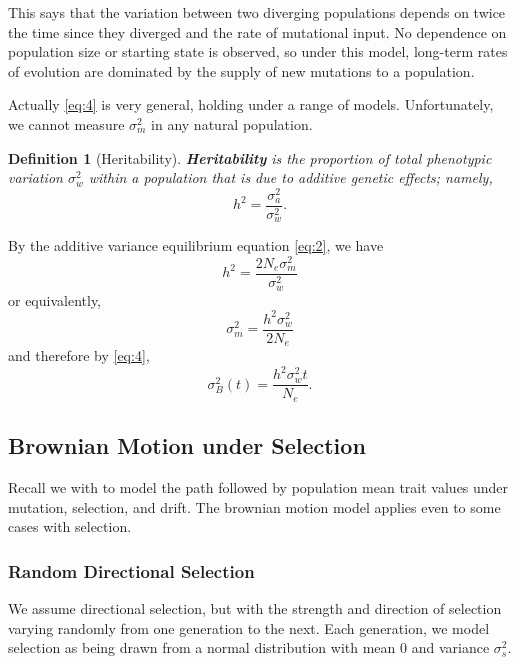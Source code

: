 \documentclass{article}
\newtheorem{definition}{Definition}
\newcommand{\1}[1]{\textbf{1}_{\left[#1\right]}} %
\newcommand{\advar}{\sigma_{a}^{2}} %
\newcommand{\bvar}{\sigma_{B}^{2}}  %
\newcommand{\mvar}{\sigma_{m}^{2}}  %
\newcommand{\wvar}{\sigma_{w}^{2}}  %
\newcommand{\svar}{\sigma_{s}^{2}}  %
\begin{document}
This says that the variation between two diverging populations depends on twice
the time since they diverged and the rate of mutational input. No dependence on
population size or starting state is observed, so under this model, long-term
rates of evolution are dominated by the supply of new mutations to a population.

Actually \eqref{eq:4} is very general, holding under a range of models.
Unfortunately, we cannot measure $\mvar$ in any natural population.




\begin{definition}[Heritability]
  \textbf{Heritability} is the proportion of total phenotypic variation $\wvar$
  within a population that is due to additive genetic effects; namely,
  \begin{equation}
    \label{eq:5}
    h^{2}=\frac{\advar}{\wvar}.
  \end{equation}
\end{definition}

By the additive variance equilibrium equation \eqref{eq:2}, we have
\begin{equation}
  \label{eq:6}
  h^{2}= \frac{2N_{e}\mvar}{\wvar}
\end{equation}
or equivalently,
\begin{equation}
  \label{eq:7}
  \mvar = \frac{h^{2}\wvar}{2N_{e}}
\end{equation}
and therefore by \eqref{eq:4},
\begin{equation}
  \label{eq:8}
  \bvar(t) = \frac{h^{2}\wvar t}{N_{e}}.
\end{equation}


\subsection{Brownian Motion under Selection}
Recall we with to model the path followed by population mean trait values under
mutation, selection, and drift. The brownian motion model applies even to some
cases with selection.

\subsubsection{Random Directional Selection}
We assume directional selection, but with the strength and direction of
selection varying randomly from one generation to the next. Each generation, we
model selection as being drawn from a normal distribution with mean 0 and
variance $\svar$.
\end{document}
